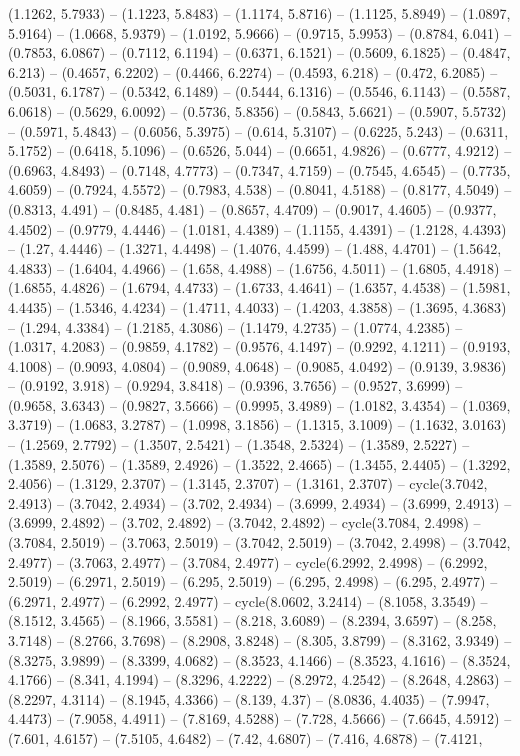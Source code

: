 (1.1262, 5.7933) -- (1.1223, 5.8483) -- (1.1174, 5.8716) -- (1.1125, 5.8949) -- (1.0897, 5.9164) -- (1.0668, 5.9379) -- (1.0192, 5.9666) -- (0.9715, 5.9953) -- (0.8784, 6.041) -- (0.7853, 6.0867) -- (0.7112, 6.1194) -- (0.6371, 6.1521) -- (0.5609, 6.1825) -- (0.4847, 6.213) -- (0.4657, 6.2202) -- (0.4466, 6.2274) -- (0.4593, 6.218) -- (0.472, 6.2085) -- (0.5031, 6.1787) -- (0.5342, 6.1489) -- (0.5444, 6.1316) -- (0.5546, 6.1143) -- (0.5587, 6.0618) -- (0.5629, 6.0092) -- (0.5736, 5.8356) -- (0.5843, 5.6621) -- (0.5907, 5.5732) -- (0.5971, 5.4843) -- (0.6056, 5.3975) -- (0.614, 5.3107) -- (0.6225, 5.243) -- (0.6311, 5.1752) -- (0.6418, 5.1096) -- (0.6526, 5.044) -- (0.6651, 4.9826) -- (0.6777, 4.9212) -- (0.6963, 4.8493) -- (0.7148, 4.7773) -- (0.7347, 4.7159) -- (0.7545, 4.6545) -- (0.7735, 4.6059) -- (0.7924, 4.5572) -- (0.7983, 4.538) -- (0.8041, 4.5188) -- (0.8177, 4.5049) -- (0.8313, 4.491) -- (0.8485, 4.481) -- (0.8657, 4.4709) -- (0.9017, 4.4605) -- (0.9377, 4.4502) -- (0.9779, 4.4446) -- (1.0181, 4.4389) -- (1.1155, 4.4391) -- (1.2128, 4.4393) -- (1.27, 4.4446) -- (1.3271, 4.4498) -- (1.4076, 4.4599) -- (1.488, 4.4701) -- (1.5642, 4.4833) -- (1.6404, 4.4966) -- (1.658, 4.4988) -- (1.6756, 4.5011) -- (1.6805, 4.4918) -- (1.6855, 4.4826) -- (1.6794, 4.4733) -- (1.6733, 4.4641) -- (1.6357, 4.4538) -- (1.5981, 4.4435) -- (1.5346, 4.4234) -- (1.4711, 4.4033) -- (1.4203, 4.3858) -- (1.3695, 4.3683) -- (1.294, 4.3384) -- (1.2185, 4.3086) -- (1.1479, 4.2735) -- (1.0774, 4.2385) -- (1.0317, 4.2083) -- (0.9859, 4.1782) -- (0.9576, 4.1497) -- (0.9292, 4.1211) -- (0.9193, 4.1008) -- (0.9093, 4.0804) -- (0.9089, 4.0648) -- (0.9085, 4.0492) -- (0.9139, 3.9836) -- (0.9192, 3.918) -- (0.9294, 3.8418) -- (0.9396, 3.7656) -- (0.9527, 3.6999) -- (0.9658, 3.6343) -- (0.9827, 3.5666) -- (0.9995, 3.4989) -- (1.0182, 3.4354) -- (1.0369, 3.3719) -- (1.0683, 3.2787) -- (1.0998, 3.1856) -- (1.1315, 3.1009) -- (1.1632, 3.0163) -- (1.2569, 2.7792) -- (1.3507, 2.5421) -- (1.3548, 2.5324) -- (1.3589, 2.5227) -- (1.3589, 2.5076) -- (1.3589, 2.4926) -- (1.3522, 2.4665) -- (1.3455, 2.4405) -- (1.3292, 2.4056) -- (1.3129, 2.3707) -- (1.3145, 2.3707) -- (1.3161, 2.3707) -- cycle(3.7042, 2.4913) -- (3.7042, 2.4934) -- (3.702, 2.4934) -- (3.6999, 2.4934) -- (3.6999, 2.4913) -- (3.6999, 2.4892) -- (3.702, 2.4892) -- (3.7042, 2.4892) -- cycle(3.7084, 2.4998) -- (3.7084, 2.5019) -- (3.7063, 2.5019) -- (3.7042, 2.5019) -- (3.7042, 2.4998) -- (3.7042, 2.4977) -- (3.7063, 2.4977) -- (3.7084, 2.4977) -- cycle(6.2992, 2.4998) -- (6.2992, 2.5019) -- (6.2971, 2.5019) -- (6.295, 2.5019) -- (6.295, 2.4998) -- (6.295, 2.4977) -- (6.2971, 2.4977) -- (6.2992, 2.4977) -- cycle(8.0602, 3.2414) -- (8.1058, 3.3549) -- (8.1512, 3.4565) -- (8.1966, 3.5581) -- (8.218, 3.6089) -- (8.2394, 3.6597) -- (8.258, 3.7148) -- (8.2766, 3.7698) -- (8.2908, 3.8248) -- (8.305, 3.8799) -- (8.3162, 3.9349) -- (8.3275, 3.9899) -- (8.3399, 4.0682) -- (8.3523, 4.1466) -- (8.3523, 4.1616) -- (8.3524, 4.1766) -- (8.341, 4.1994) -- (8.3296, 4.2222) -- (8.2972, 4.2542) -- (8.2648, 4.2863) -- (8.2297, 4.3114) -- (8.1945, 4.3366) -- (8.139, 4.37) -- (8.0836, 4.4035) -- (7.9947, 4.4473) -- (7.9058, 4.4911) -- (7.8169, 4.5288) -- (7.728, 4.5666) -- (7.6645, 4.5912) -- (7.601, 4.6157) -- (7.5105, 4.6482) -- (7.42, 4.6807) -- (7.416, 4.6878) -- (7.4121, 